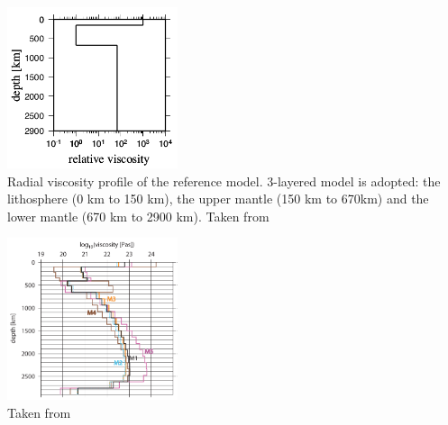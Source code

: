 

\begin{center}
\includegraphics[width=5cm]{images/viscosity_profile/yohk01}\\
{\captionfont Radial viscosity profile of the reference model. 3-layered model is adopted: 
the lithosphere (0 km to 150 km), the upper mantle (150 km to 670km) 
and the lower mantle (670 km to 2900 km). Taken from \cite{yohk01}}
\end{center}

\begin{center}
\includegraphics[width=5cm]{images/viscosity_profile/stca06}\\
{\captionfont Taken from \cite{stca06}}
\end{center}



